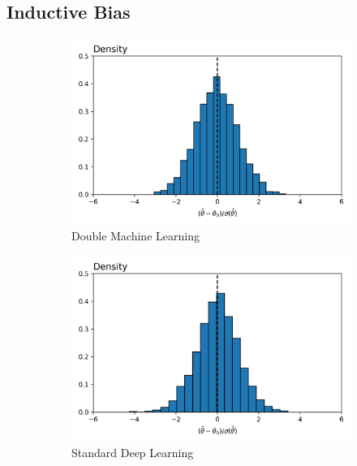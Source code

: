 \documentclass[a4paper,12pt]{article}
\begin{document}
\subsection{Inductive Bias}
\label{subsec:ib}


\begin{figure}[htbp]
\centering
\begin{subfigure}{.32\textwidth}
    \centering
    \includegraphics[width=.95\linewidth]{figures/framework/dml_original.png}
    \caption{Double Machine Learning}
    \label{fig:overfittails}
\end{subfigure}
\begin{subfigure}{.32\textwidth}
    \centering
    \includegraphics[width=.95\linewidth]{figures/framework/dml_standard_nn.png}
        \caption{Standard Deep Learning}
    \label{fig:wrongspace}
\end{subfigure}
\begin{subfigure}{.32\textwidth}
    \centering

\end{subfigure}
\end{figure}
\end{document}
